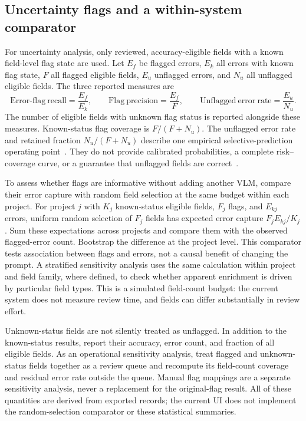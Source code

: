 \documentclass[11pt]{article}
\begin{document}
\subsection{Uncertainty flags and a within-system comparator}

For uncertainty analysis, only reviewed, accuracy-eligible fields with a known field-level flag state are used. Let $E_f$ be flagged errors, $E_k$ all errors with known flag state, $F$ all flagged eligible fields, $E_u$ unflagged errors, and $N_u$ all unflagged eligible fields. The three reported measures are
\begin{equation}
 \mathrm{Error\text{-}flag\ recall}=\frac{E_f}{E_k},\qquad
 \mathrm{Flag\ precision}=\frac{E_f}{F},\qquad
 \mathrm{Unflagged\ error\ rate}=\frac{E_u}{N_u}.
\end{equation}
The number of eligible fields with unknown flag status is reported alongside these measures. Known-status flag coverage is $F/(F+N_u)$. The unflagged error rate and retained fraction $N_u/(F+N_u)$ describe one empirical selective-prediction operating point~\cite{geifman2017}. They do not provide calibrated probabilities, a complete risk--coverage curve, or a guarantee that unflagged fields are correct~\cite{guo2017}.

To assess whether flags are informative without adding another VLM, compare their error capture with random field selection at the same budget within each project. For project $j$ with $K_j$ known-status eligible fields, $F_j$ flags, and $E_{kj}$ errors, uniform random selection of $F_j$ fields has expected error capture $F_jE_{kj}/K_j$. Sum these expectations across projects and compare them with the observed flagged-error count. Bootstrap the difference at the project level. This comparator tests association between flags and errors, not a causal benefit of changing the prompt. A stratified sensitivity analysis uses the same calculation within project and field family, where defined, to check whether apparent enrichment is driven by particular field types. This is a simulated field-count budget: the current system does not measure review time, and fields can differ substantially in review effort.

Unknown-status fields are not silently treated as unflagged. In addition to the known-status results, report their accuracy, error count, and fraction of all eligible fields. As an operational sensitivity analysis, treat flagged and unknown-status fields together as a review queue and recompute its field-count coverage and residual error rate outside the queue. Manual flag mappings are a separate sensitivity analysis, never a replacement for the original-flag result. All of these quantities are derived from exported records; the current UI does not implement the random-selection comparator or these statistical summaries.
\end{document}

